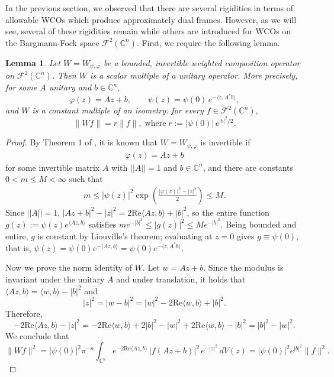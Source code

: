\documentclass{amsart}
\newtheorem{lem}[thm]{Lemma}
\theoremstyle{definition}
\theoremstyle{remark}
\numberwithin{equation}{section}
\begin{document}
In the previous section, we observed that there are several rigidities in terms of allowable WCOs which produce approximately dual frames. However, as we will see, several of these rigidities remain while others are introduced for WCOs on the Bargmann-Fock space $\mathcal{F}^{2}(\mathbb{C}^{n})$. First, we require the following lemma. 
\begin{lem}\label{wco_fock_lem}
    Let $W = W_{\psi,\varphi}$ be a bounded, invertible weighted
composition operator on $\mathcal{F}^2(\mathbb{C}^n)$. Then $W$ is a scalar
multiple of a unitary operator. More precisely, for some $A$ unitary and $b \in \mathbb{C}^n$,
\[
\varphi(z) = Az + b, \qquad
\psi(z) = \psi(0)\, e^{-\langle z, A^*b\rangle},
\]
and $W$ is a constant multiple of an isometry: for every
$f \in \mathcal{F}^2(\mathbb{C}^n)$,
\[
\|Wf\| = r\|f\|,\; \text{where} \; r := |\psi(0)|\, e^{|b|^2/2}.
\]
\end{lem}
\begin{proof}
    By Theorem 1 of \cite{zhao2015invertible}, it is known that $W=W_{\psi,\varphi}$ is invertible if 
    \begin{align*}
        \varphi(z)=Az+b
    \end{align*}
    for some invertible matrix $A$ with $||A||=1$ and $b\in\mathbb{C}^{n}$, and there are constants $0<m\leq M<\infty$ such that
    \begin{align*}
        m\leq \left|\psi(z)\right|^{2}\exp\left(\frac{\left|\varphi(z)\right|^{2}-|z|^{2}}{2}\right)\leq M.
    \end{align*}
Since $||A||=1$, $|Az + b|^2 - |z|^2 = 2\text{Re}\langle Az, b\rangle
+ |b|^2$, so the entire function
$g(z) := \psi(z)e^{\langle Az, b\rangle}$ satisfies
$m e^{-|b|^2} \le |g(z)|^2 \le M e^{-|b|^2}$. Being bounded and
entire, $g$ is constant by Liouville's theorem; evaluating at $z = 0$
gives $g \equiv \psi(0)$, that is,
$\psi(z) = \psi(0)e^{-\langle Az, b\rangle}
         = \psi(0)e^{-\langle z, A^*b\rangle}$.
         
 Now we prove the norm identity of $W$. Let $w = Az + b$. Since the modulus is
invariant under the unitary $A$ and under translation, it holds that 
$\langle Az, b\rangle = \langle w, b\rangle - |b|^2$ and
$$|z|^2 = |w - b|^2 = |w|^2 - 2\text{Re}\langle w, b\rangle + |b|^2.$$
Therefore,
\[
-2\text{Re}\langle Az, b\rangle - |z|^2
= -2\text{Re}\langle w, b\rangle + 2|b|^2
  - |w|^2 + 2\text{Re}\langle w, b\rangle - |b|^2
= |b|^2 - |w|^2 .
\]
We conclude that
\[
\|Wf\|^2
= |\psi(0)|^2\pi^{-n}\int_{\mathbb{C}^n}
  e^{-2\text{Re}\langle Az, b\rangle}\, |f(Az+b)|^2\, e^{-|z|^2}\, dV(z)
= |\psi(0)|^2 e^{|b|^2} \|f\|^2.
\]
\end{proof}
\end{document}
